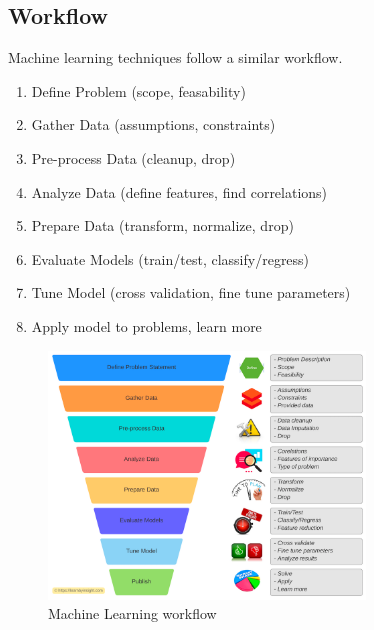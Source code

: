 \subsection{Workflow}
\label{subsec:introduction-workflow}
\begin{frame}{\insertsubsection}
    Machine learning techniques follow a similar workflow.
    \begin{enumerate}[<+->]
        \item Define Problem (scope, feasability)
        \item Gather Data (assumptions, constraints)
        \item Pre-process Data (cleanup, drop)
        \item Analyze Data (define features, find correlations)
        \item Prepare Data (transform, normalize, drop)
        \item Evaluate Models (train/test, classify/regress)
        \item Tune Model (cross validation, fine tune parameters)
        \item Apply model to problems, learn more
    \end{enumerate}
\end{frame}
%
%
\begin{frame}{\insertsubsection}
    \begin{figure}
        \centering
        \includegraphics[width=0.75\textwidth]{media/ml-workflow.png}
        \caption{Machine Learning workflow~\cite{Mewara2020}}
    \end{figure}
\end{frame}